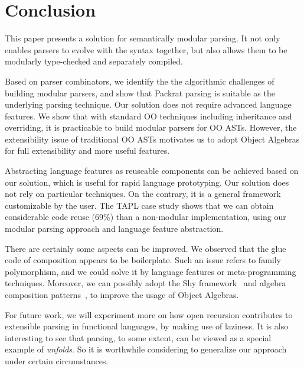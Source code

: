 \section{Conclusion}\label{sec:conclusion}

This paper presents a solution for semantically modular parsing. It not only
enables parsers to evolve with the syntax together, but also allows them to be modularly type-checked and separately compiled.

Based on parser combinators, we identify the the algorithmic challenges of building modular parsers, and show that Packrat parsing is suitable as the underlying parsing technique. Our solution does not require advanced language features. We show that with standard OO techniques including inheritance and overriding, it is practicable to build modular parsers for OO ASTs. However, the extensibility issue of traditional OO ASTs motivates us to adopt Object Algebras for full extensibility and more useful features.

Abstracting language features as reuseable components can be achieved based on our solution, which is useful for rapid language prototyping. Our solution does not rely on particular techniques. On the contrary, it is a general framework customizable by the user. The TAPL case study shows that we can obtain considerable code reuse (69\%) than a non-modular implementation, using our modular parsing approach and language feature abstraction.

There are certainly some aspects can be improved. We observed that the glue code of composition appears to be boilerplate. Such an issue refers to family polymorphism, and we could solve it by language features or meta-programming techniques. Moreover, we can possibly adopt the Shy framework~\cite{Zhang2015} and algebra composition patterns~\cite{oliveira2013feature}, to improve the usage of Object Algebras.

For future work, we will experiment more on how open recursion contributes to extensible parsing in functional languages, by making use of laziness. It is also interesting to see that parsing, to some extent, can be viewed as a special example of \textit{unfolds}. So it is worthwhile considering to generalize our approach under certain circumstances.
